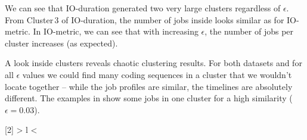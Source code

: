 \documentclass{jhps}
\begin{document}
We can see that IO-duration generated two very large clusters regardless of $\epsilon$.
From Cluster\,3 of IO-duration, the number of jobs inside looks similar as for IO-metric.
In IO-metric, we can see that with increasing $\epsilon$, the number of jobs per cluster increases (as expected).

A look inside clusters reveals chaotic clustering results.
For both datasets and for all $\epsilon$ values we could find many coding sequences in a cluster that we wouldn't locate together -- while the job profiles are similar, the timelines are absolutely different.
The examples in  show some jobs in one cluster for a high similarity ($\epsilon = 0.03$).

\def\rd{3}
\newcolumntype{R}[2]{%
    >{\bgroup}%
    l%
    <{\egroup}%
}
\newcommand*\rot{\multicolumn{1}{R{30}{1em}}}%
\end{document}
